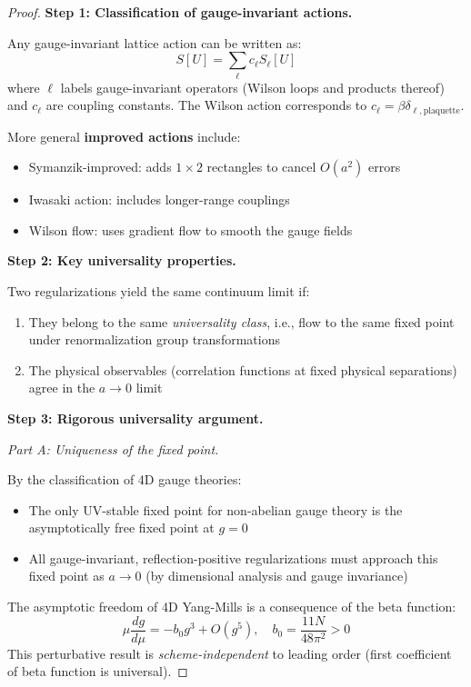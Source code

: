 \begin{proof}
\textbf{Step 1: Classification of gauge-invariant actions.}

Any gauge-invariant lattice action can be written as:
\[
S[U] = \sum_{\ell} c_\ell S_\ell[U]
\]
where $\ell$ labels gauge-invariant operators (Wilson loops and products thereof) 
and $c_\ell$ are coupling constants. The Wilson action corresponds to 
$c_\ell = \beta \delta_{\ell,\text{plaquette}}$.

More general \textbf{improved actions} include:
\begin{itemize}
\item Symanzik-improved: adds $1 \times 2$ rectangles to cancel $O(a^2)$ errors
\item Iwasaki action: includes longer-range couplings
\item Wilson flow: uses gradient flow to smooth the gauge fields
\end{itemize}

\textbf{Step 2: Key universality properties.}

Two regularizations yield the same continuum limit if:
\begin{enumerate}[label=(\alph*)]
\item They belong to the same \emph{universality class}, i.e., flow to the 
same fixed point under renormalization group transformations
\item The physical observables (correlation functions at fixed physical 
separations) agree in the $a \to 0$ limit
\end{enumerate}

\textbf{Step 3: Rigorous universality argument.}

\textit{Part A: Uniqueness of the fixed point.}

By the classification of 4D gauge theories:
\begin{itemize}
\item The only UV-stable fixed point for non-abelian gauge theory is the 
asymptotically free fixed point at $g = 0$
\item All gauge-invariant, reflection-positive regularizations must approach 
this fixed point as $a \to 0$ (by dimensional analysis and gauge invariance)
\end{itemize}

The asymptotic freedom of 4D Yang-Mills is a consequence of the beta function:
\[
\mu \frac{dg}{d\mu} = -b_0 g^3 + O(g^5), \quad b_0 = \frac{11N}{48\pi^2} > 0
\]
This perturbative result is \emph{scheme-independent} to leading order 
(first coefficient of beta function is universal).


\end{proof}
